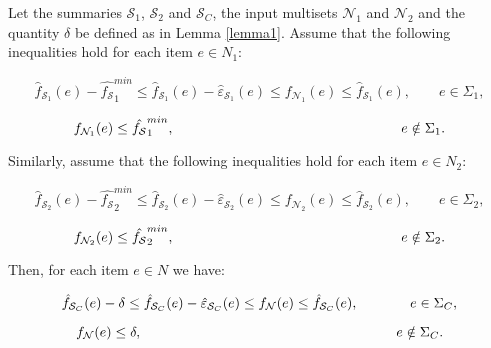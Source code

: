 \documentclass[final,3p,times]{elsarticle}
\newcommand\noi{\noindent}
\begin{document}
\begin{lem}
\label{lemma2}
Let the summaries $\mathcal{S}_1$, $\mathcal{S}_2$ and $\mathcal{S}_C$, the input multisets $\mathcal{N}_1$ and $\mathcal{N}_2$ and the quantity $\delta$ be defined as in Lemma \ref{lemma1}. Assume that the following inequalities hold for each item $e \in N_1$: 

\begin{equation}
\label{eq15}
\hat{f}_{\mathcal{S}_1}(e) - \hat{f_\mathcal{S}}_1^{min} \leq \hat{f}_{\mathcal{S}_1}(e) - \hat{\varepsilon}_{\mathcal{S}_1}(e) \leq f_{\mathcal{N}_1}(e) \leq \hat{f}_{\mathcal{S}_1}(e), \qquad e \in \Sigma_1,
\end{equation}

\begin{equation}
\label{eq16}
f_{\mathcal{N}_1}(e)  \leq \hat{f_\mathcal{S}}_1^{min}, \qquad \hspace{50 mm} e \notin \Sigma_1.
\end{equation}


\noi Similarly, assume that the following inequalities hold for each item $e \in N_2$: 

\begin{equation}
\label{eq17}
\hat{f}_{\mathcal{S}_2}(e) - \hat{f_\mathcal{S}}_2^{min} \leq \hat{f}_{\mathcal{S}_2}(e) - \hat{\varepsilon}_{\mathcal{S}_2}(e) \leq f_{\mathcal{N}_2}(e) \leq \hat{f}_{\mathcal{S}_2}(e), \qquad  e \in \Sigma_2,
\end{equation}

\begin{equation}
\label{eq18}
f_{\mathcal{N}_2}(e)  \leq \hat{f_\mathcal{S}}_2^{min}, \qquad \hspace{50mm} e \notin \Sigma_2.
\end{equation}

\noi Then, for each item $e \in N$ we have:

\begin{equation}
\label{eq19}
\hat{f}_{\mathcal{S}_C}(e) - \delta \leq  \hat{f}_{\mathcal{S}_C}(e) -  \hat{\varepsilon}_{\mathcal{S}_C}(e) \leq    f_\mathcal{N}(e) \leq  \hat{f}_{\mathcal{S}_C}(e), \qquad  \hspace{6 mm} e \in \Sigma_C,
\end{equation}

\begin{equation}
\label{eq20}
f_\mathcal{N}(e) \leq \delta, \qquad \hspace{57 mm} e \notin \Sigma_C.
\end{equation}
 
\end{lem}
\end{document}
